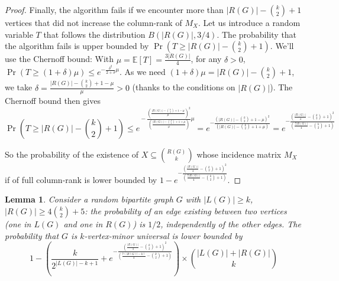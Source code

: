 \documentclass[10pt,a4paper]{article}
\newtheorem{lemma}{Lemma}[section]
\newcommand{\se}{\subseteq}
\newcommand{\ls}{\leqslant}
\newcommand{\gs}{\geqslant}
\begin{document}
\begin{proof}
    Finally, the algorithm fails if we encounter more than $|R(G)|-{k \choose 2}+1$ vertices that did not increase the column-rank of $M_X$. Let us introduce a random variable $T$ that follows the distribution $B(|R(G)|,3/4)$. The probability that the algorithm fails is upper bounded by $\Pr(T \gs |R(G)|-{k \choose 2}+1)$. We'll use the Chernoff bound: With $\mu = \mathbb{E}[T] = \frac{3|R(G)|}{4}$, for any $\delta > 0$, $\Pr(T \gs (1+\delta)\mu) \ls e^{-\frac{\delta^2}{2+\delta}\mu}$. As we need $(1+\delta)\mu = |R(G)|-{k \choose 2}+1$, we take $\delta = \frac{|R(G)|-{k \choose 2}+1-\mu}{\mu} >0$ (thanks to the conditions on $|R(G)|$). The Chernoff bound then gives $$ \Pr\left(T \gs |R(G)|\!-\!{k \choose 2}\!+\!1\right) \ls e^{\!-\frac{\left(\frac{|R(G)|-{k \choose 2}+1-\mu}{\mu}\right)^2}{\left(\frac{|R(G)|-{k \choose 2}+1+\mu}{\mu}\right)}\mu} \!\!\!\!\!= e^{-\frac{\left(|R(G)|-{k \choose 2}+1-\mu\right)^2}{\left(|R(G)|-{k \choose 2}+1+\mu\right)}} = e^{-\frac{\left(\frac{|R(G)|}{4}-{k \choose 2}+1\right)^2}{\left(\frac{7|R(G)|}{4}-{k \choose 2}+1\right)}} $$

    So the probability of the existence of $X \se {R(G) \choose k}$ whose incidence matrix $M_X$ if of full column-rank is lower bounded by $ 1 -e^{-\frac{\left(\frac{|R(G)|}{4}-{k \choose 2}+1\right)^2}{\left(\frac{7|R(G)|}{4}-{k \choose 2}+1\right)}} $.

\end{proof}

\begin{lemma}
    \label{prop:proba_vmu}
    Consider a random bipartite graph $G$ with $|L(G)|\gs k$, $|R(G)|\gs4{k \choose 2}+5$: the probability of an edge existing between two vertices (one in $L(G)$ and one in $R(G)$) is $1/2$, independently of the other edges. The probability that $G$ is $k$-vertex-minor universal is lower bounded by $$  1 - \left( \frac{k}{2^{|L(G)|-k+1}} + e^{-\frac{\left(\frac{|R(G)|}{4}-{k \choose 2}+1\right)^2}{\left(\frac{7(|R(G)|-k)}{4}-{k \choose 2}+1\right)}}\right)\times {|L(G)|+|R(G)| \choose k} $$
\end{lemma}
\end{document}
